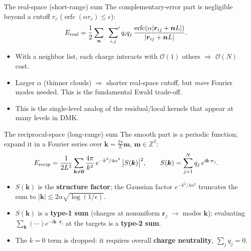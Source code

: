 \documentclass[aspectratio=169,11pt]{beamer}
\newcommand{\Z}{\mathbb{Z}}
\newcommand{\cO}{\mathcal{O}}
\newcommand{\ii}{\mathrm i}
\newcommand{\kk}{\bm{k}}
\newcommand{\mm}{\bm{m}}
\newcommand{\nnn}{\bm{n}}
\newcommand{\rr}{\bm{r}}
\newcommand{\hl}[1]{{\color{CCMorange}\textbf{#1}}}
\DeclareMathOperator{\erfc}{erfc}
\begin{document}
\begin{frame}{The real-space (short-range) sum}
\small
The complementary-error part is negligible beyond a cutoff \(r_c\) (\(\erfc(\alpha r_c)\le\epsilon\)):
\[
  E_{\rm real}=\frac12\sum_{\nnn}\ \sideset{}{'}\sum_{i,j}
     q_i q_j\,\frac{\erfc(\alpha|\rr_{ij}+\nnn L|)}{|\rr_{ij}+\nnn L|}.
\]
\begin{itemize}
  \item With a neighbor list, each charge interacts with \(\cO(1)\) others \(\Rightarrow\) \hl{\(\cO(N)\)} cost.
  \item Larger \(\alpha\) (thinner clouds) \(\Rightarrow\) shorter real-space cutoff, but \emph{more} Fourier modes needed. This is the fundamental Ewald trade-off.
  \item This is the single-level analog of the residual/local kernels that
  appear at many levels in DMK.
\end{itemize}
\end{frame}

\begin{frame}{The reciprocal-space (long-range) sum}
\small
The smooth part is a periodic function; expand it in a Fourier series over \(\kk=\tfrac{2\pi}{L}\mm\), \(\mm\in\Z^3\):
\[
  E_{\rm recip}=\frac{1}{2L^3}\sum_{\kk\neq \bm0}\frac{4\pi}{k^2}\,e^{-k^2/4\alpha^2}\,\big|S(\kk)\big|^2,
  \qquad
  S(\kk)=\sum_{j=1}^N q_j\, e^{\ii\kk\cdot\rr_j}.
\]
\begin{itemize}
  \item \(S(\kk)\) is the \hl{structure factor}; the Gaussian factor \(e^{-k^2/4\alpha^2}\) truncates the sum to \(|\kk|\lesssim 2\alpha\sqrt{\log(1/\epsilon)}\).
  \item \(S(\kk)\) is a \hl{type-1 sum} (charges at nonuniform \(\rr_j\) \(\to\) modes \(\kk\)); evaluating \(\sum_{\kk}(\cdots)e^{-\ii\kk\cdot\rr_i}\) at the targets is a \hl{type-2 sum}.
  \item The \(k=0\) term is dropped: it requires overall \hl{charge neutrality}, \(\sum_j q_j=0\).
\end{itemize}
\end{frame}
\end{document}
